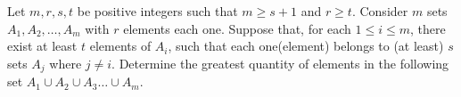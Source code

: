 Let $m, r, s, t$ be positive integers such that $m\geq s+1$ and $r\geq t$. Consider $m$ sets $A_1, A_2, \dots, A_m$ with $r$ elements each one. Suppose that, for each $1\leq i\leq m$, there exist at least $t$ elements of $A_i$, such that each one(element) belongs to (at least) $s$ sets $A_j$ where $j\neq i$. Determine the greatest quantity of elements in the following set $A_1 \cup A_2 \cup A_3 \dots \cup A_m$.
